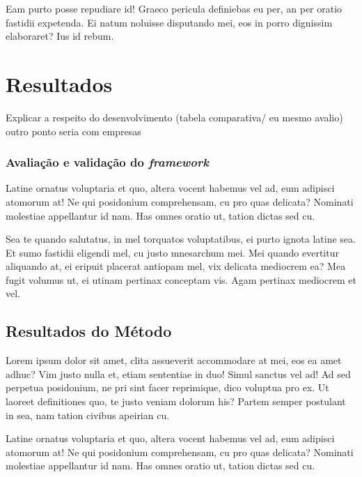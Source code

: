 \documentclass[
	12pt,				%
	openright,			%
	oneside,			%
	a4paper,			%
	english,			%
	french,				%
	spanish,			%
	brazil,				%
	]{abntex2}
\begin{document}
Eam purto posse repudiare id! Graeco pericula definiebas eu per, an per oratio fastidii expetenda. Ei natum noluisse disputando mei, eos in porro dignissim elaboraret? Ius id rebum.


\chapter{Resultados}
\label{ch: resultados} 

Explicar a respeito do desenvolvimento (tabela comparativa/ eu mesmo avalio)
outro ponto seria com empresas

\subsection{Avaliação e validação do \textit{framework} }

Latine ornatus voluptaria et quo, altera vocent habemus vel ad, eum adipisci atomorum at! Ne qui posidonium comprehensam, cu pro quas delicata? Nominati molestiae appellantur id nam. Has omnes oratio ut, tation dictas sed cu.

Sea te quando salutatus, in mel torquatos voluptatibus, ei purto ignota latine sea. Et sumo fastidii eligendi mel, cu justo mnesarchum mei. Mei quando evertitur aliquando at, ei eripuit placerat antiopam mel, vix delicata mediocrem ea? Mea fugit volumus ut, ei utinam pertinax conceptam vis. Agam pertinax mediocrem et vel.


 
\section{Resultados do Método}
\label{sec: resultados}

Lorem ipsum dolor sit amet, clita assueverit accommodare at mei, eos ea amet adhuc? Vim justo nulla et, etiam sententiae in duo! Simul sanctus vel ad! Ad sed perpetua posidonium, ne pri sint facer reprimique, dico voluptua pro ex. Ut laoreet definitiones quo, te justo veniam dolorum his? Partem semper postulant in sea, nam tation civibus apeirian cu.

Latine ornatus voluptaria et quo, altera vocent habemus vel ad, eum adipisci atomorum at! Ne qui posidonium comprehensam, cu pro quas delicata? Nominati molestiae appellantur id nam. Has omnes oratio ut, tation dictas sed cu.
\end{document}
